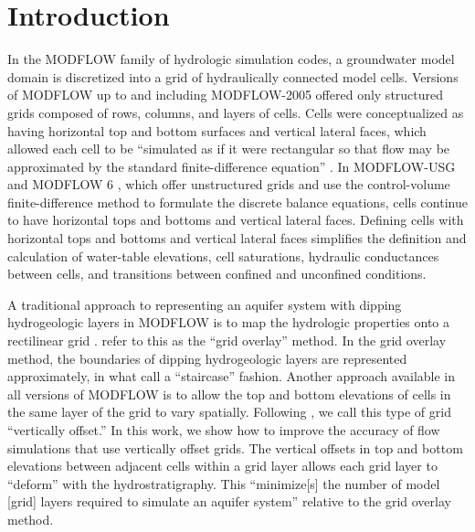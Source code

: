 \documentclass{article}
\begin{document}
\section{Introduction}

In the MODFLOW family of hydrologic simulation codes, a groundwater model domain is discretized into a grid of hydraulically connected model cells. Versions of MODFLOW up to and including MODFLOW-2005 \citep{modflow2005} offered only structured grids composed of rows, columns, and layers of cells. Cells were conceptualized as having horizontal top and bottom surfaces and vertical lateral faces, which allowed each cell to be ``simulated as if it were rectangular so that flow may be approximated by the standard finite-difference equation'' \citep{modflow84}. In MODFLOW-USG \citep{modflowusg} and MODFLOW 6 \citep{modflow6gwf}, which offer unstructured grids and use the control-volume finite-difference method to formulate the discrete balance equations, cells continue to have horizontal tops and bottoms and vertical lateral faces.  Defining cells with horizontal tops and bottoms and vertical lateral faces simplifies the definition and calculation of water-table elevations, cell saturations, hydraulic conductances between cells, and transitions between confined and unconfined conditions.

A traditional approach to representing an aquifer system with dipping hydrogeologic layers in MODFLOW is to map the hydrologic properties onto a rectilinear grid \citep{modflow84}.  \cite{hoaglund2003} refer to this as the ``grid overlay'' method.  In the grid overlay method, the boundaries of dipping hydrogeologic layers are represented approximately, in what \cite{bardot2022} call a ``staircase'' fashion.  Another approach available in all versions of MODFLOW is to allow the top and bottom elevations of cells in the same layer of the grid to vary spatially. Following \cite{bardot2022}, we call this type of grid ``vertically offset.'' In this work, we show how to improve the accuracy of flow simulations that use vertically offset grids. The vertical offsets in top and bottom elevations between adjacent cells within a grid layer allows each grid layer to ``deform'' with the hydrostratigraphy. This ``minimize[s] the number of model [grid] layers required to simulate an aquifer system'' \citep{modflow84} relative to the grid overlay method.
\end{document}
